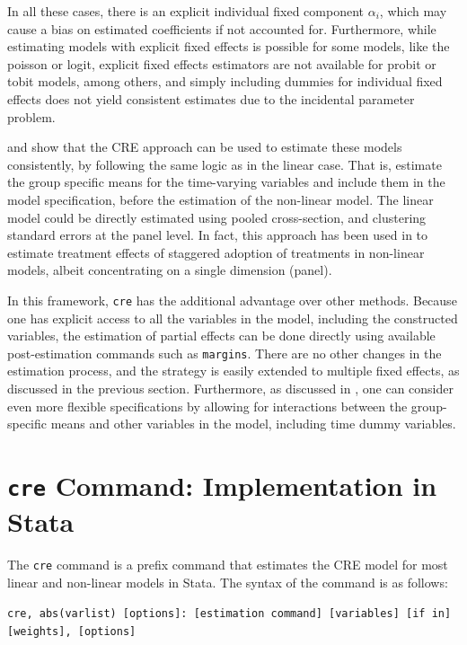 \documentclass[bib]{statapress}
\begin{document}
In all these cases, there is an explicit individual fixed component
\(\alpha_i\), which may cause a bias on estimated coefficients if not
accounted for. Furthermore, while estimating models with explicit fixed
effects is possible for some models, like the poisson or logit, explicit
fixed effects estimators are not available for probit or tobit models,
among others, and simply including dummies for individual fixed effects
does not yield consistent estimates due to the incidental parameter
problem.

\citet{wooldridge2019} and \citet{wooldridge2010econometric} show that
the CRE approach can be used to estimate these models consistently, by
following the same logic as in the linear case. That is, estimate the
group specific means for the time-varying variables and include them in
the model specification, before the estimation of the non-linear model.
The linear model could be directly estimated using pooled cross-section,
and clustering standard errors at the panel level. In fact, this
approach has been used in \citet{wooldridge2023} to estimate treatment
effects of staggered adoption of treatments in non-linear models, albeit
concentrating on a single dimension (panel).

In this framework, \texttt{cre} has the additional advantage over other
methods. Because one has explicit access to all the variables in the
model, including the constructed variables, the estimation of partial
effects can be done directly using available post-estimation commands
such as \texttt{margins}. There are no other changes in the estimation
process, and the strategy is easily extended to multiple fixed effects,
as discussed in the previous section. Furthermore, as discussed in
\citet{wooldridge2019}, one can consider even more flexible
specifications by allowing for interactions between the group-specific
means and other variables in the model, including time dummy variables.

\section{\texorpdfstring{\texttt{cre} Command: Implementation in
Stata}{cre Command: Implementation in Stata}}\label{sec-3}

The \texttt{cre} command is a prefix command that estimates the CRE
model for most linear and non-linear models in Stata. The syntax of the
command is as follows:

\texttt{cre,\ abs(varlist)\ {[}options{]}:\ {[}estimation\ command{]}\ {[}variables{]}\ {[}if\ in{]}\ {[}weights{]},\ {[}options{]}}
\end{document}

